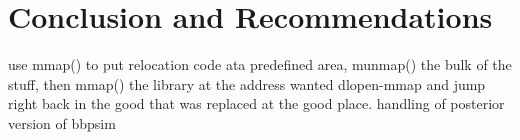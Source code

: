 \chapter{Conclusion and Recommendations}\label{cha:conclusion}
use mmap() to put relocation code ata predefined area, munmap() the bulk of the stuff, then mmap() the library at the address wanted dlopen-mmap and jump right back in the good that was replaced at the good place. handling of posterior version of bbpsim